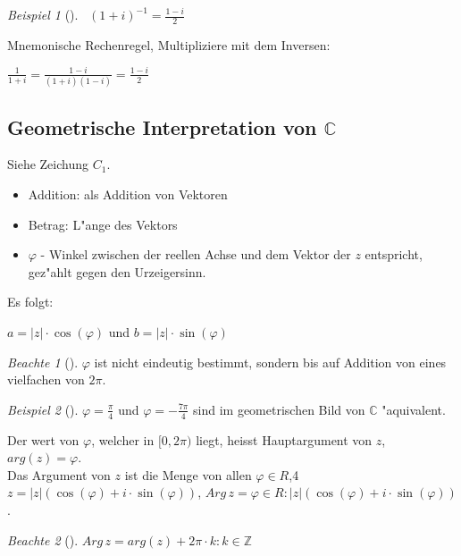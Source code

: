 \documentclass[11pt]{article}
\theoremstyle{remark}
\newtheorem{exa}{Beispiel}[section]
\newtheorem*{notte}{Beachte}
\theoremstyle{definition}
\theoremstyle{remark}
\begin{document}
\begin{exa}[] \label{} \
\((1+i)^{-1}=\frac{1-i}{2}\)
\end{exa}

Mnemonische Rechenregel, Multipliziere mit dem Inversen: 
\begin{relation}
\(\frac{1}{1+i}=\frac{1-i}{(1+i)(1-i)}=\frac{1-i}{2}\)
\end{relation}

\subsection{Geometrische Interpretation von \(\mathbb{C}\)}
\label{sec:org992fe0c}
Siehe Zeichung \(C_1\).

\begin{relation}
\begin{itemize}
\item Addition: als Addition von Vektoren
\item Betrag: L"ange des Vektors
\item \(\varphi\) - Winkel zwischen der reellen Achse und dem Vektor der \(z\) entspricht,
gez"ahlt gegen den Urzeigersinn.
\end{itemize}
\end{relation}

Es folgt:
\begin{relation}
\(a=|z|\cdot \cos(\varphi)\) und \(b=|z|\cdot \sin(\varphi)\)
\end{relation}

\begin{notte}[] \label{}
\(\varphi\) ist nicht eindeutig bestimmt, sondern bis auf Addition von eines
vielfachen von \(2\pi\).
\end{notte}

\begin{exa}[] \label{}
\(\varphi=\frac{\pi}{4}\) und \(\varphi=-\frac{7\pi}{4}\) sind im geometrischen Bild von
\(\mathbb{C}\) "aquivalent.
\end{exa}

\begin{definition}{}{}
Der wert von \(\varphi\), welcher in \([0, 2\pi)\) liegt, heisst Hauptargument von \(z\),
\(arg(z)=\varphi\).\\
Das Argument von \(z\) ist die Menge von allen \(\varphi \in R\),4
\(z=|z|(\cos(\varphi)+i\cdot \sin(\varphi))\), \(Arg\, z = {\varphi \in R : |z|(\cos(\varphi)+i\cdot \sin(\varphi))}\).
\end{definition}

\begin{notte}[] \label{}
\(Arg\, z= {arg(z)+2\pi\cdot k : k\in \mathbb{Z}}\)
\end{notte}
\end{document}
